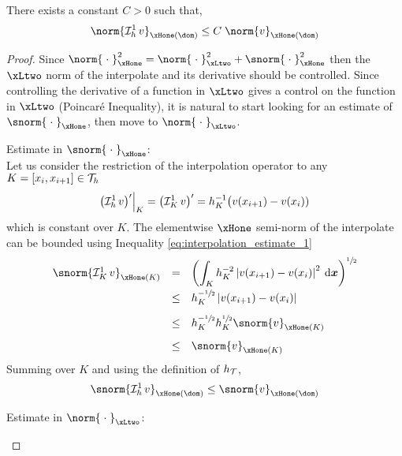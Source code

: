 \begin{prpstn}
\label{prpstn:stability_lagrange_p1}
There exists a constant $C>0$ such that,
\begin{equation}\label{eq:stability_lagrange_p1}
\norm{\Lgrh{1} v}_{\xHone(\dom)} \leq C\; \norm{v}_{\xHone(\dom)}
\end{equation}
\end{prpstn}
\begin{proof}
Since $\norm{\;\cdot\;}^2_{\xHone} = \norm{\;\cdot\;}^2_{\xLtwo} + \snorm{\;\cdot\;}^2_{\xHone}$ then the $\xLtwo$ norm of the interpolate and its derivative should be controlled. Since controlling the derivative of a function in $\xLtwo$ gives a control on the function in $\xLtwo$ (Poincaré Inequality), it is natural to start looking for an estimate of $\snorm{\;\cdot\;}_{\xHone}$, then move to $\norm{\;\cdot\;}_{\xLtwo}$.
\begin{tmaproofitems}
\item Estimate in $\snorm{\;\cdot\;}_{\xHone}$:\\
Let us consider the restriction of the interpolation operator to any $K = [x_{i}, x_{i+1}] \in {\mathcal T}_h$
\[
\Restrict{\bigl(\Lgrh{1}v\bigr)'}{K} = \bigl(\LgrK{1}v\bigr)' = h_K^{-1}\bigl(v(x_{i+1})- v(x_{i}))
\]
which is constant over $K$.
The elementwise $\xHone$ semi-norm of the interpolate can be bounded using Inequality \eqref{eq:interpolation_estimate_1}
\begin{equation*}
\begin{array}{lcl}
\snorm{\LgrK{1}v}_{\xHone(K)} &=&\displaystyle \left(\int_K h_K^{-2}\Abs{v(x_{i+1})- v(x_{i})}^2 \dxx\right)^{\sfrac{1}{2}}\\[2ex]
                              &\leq& h_K^{-\sfrac{1}{2}}\Abs{v(x_{i+1})- v(x_{i})}\\[2ex]
                              &\leq& h_K^{-\sfrac{1}{2}} h_K^{\sfrac{1}{2}}\snorm{v}_{\xHone(K)}\\[2ex]
                              &\leq& \snorm{v}_{\xHone(K)}\\
\end{array}
\end{equation*}
Summing over $K$ and using the definition of $h_{\mathcal T}$,
\begin{equation*}
\snorm{\Lgrh{1}v}_{\xHone(\dom)} \leq \snorm{v}_{\xHone(\dom)}
\end{equation*}
\item Estimate in $\norm{\;\cdot\;}_{\xLtwo}$:\\

\end{tmaproofitems}
\end{proof}
